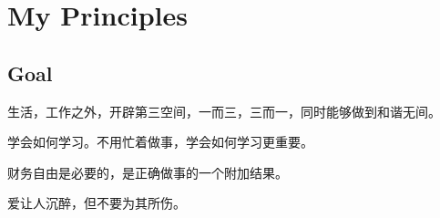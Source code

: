 \chapter{My Principles}

\section{Goal}

生活，工作之外，开辟第三空间，一而三，三而一，同时能够做到和谐无间。

学会如何学习。不用忙着做事，学会如何学习更重要。

财务自由是必要的，是正确做事的一个附加结果。

爱让人沉醉，但不要为其所伤。
